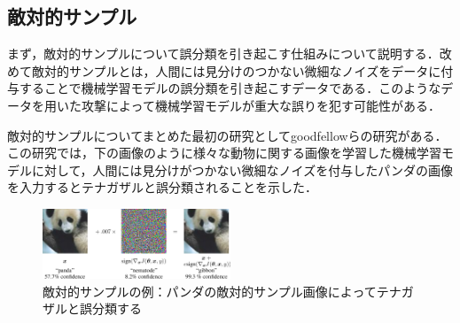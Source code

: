 


\subsection{敵対的サンプル}
まず，敵対的サンプルについて誤分類を引き起こす仕組みについて説明する．改めて敵対的サンプルとは，人間には見分けのつかない微細なノイズをデータに付与することで機械学習モデルの誤分類を引き起こすデータである．このようなデータを用いた攻撃によって機械学習モデルが重大な誤りを犯す可能性がある．

敵対的サンプルについてまとめた最初の研究としてgoodfellowらの研究\cite{goodfellow2015explaining}がある．
この研究では，下の画像のように様々な動物に関する画像を学習した機械学習モデルに対して，人間には見分けがつかない微細なノイズを付与したパンダの画像を入力するとテナガザルと誤分類されることを示した．

\begin{figure}[h]
    \centering
    \includegraphics[width=0.5\textwidth]{images/goodfellow_panda.png}
    \caption{敵対的サンプルの例：パンダの敵対的サンプル画像によってテナガザルと誤分類する}
    \label{fig:adversarial_example}
\end{figure}

